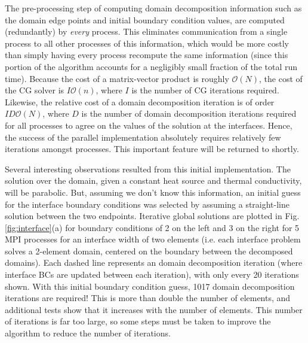 \documentclass[10pt]{article}
\begin{document}
The pre-processing step of computing domain decomposition information such as the domain edge points and initial boundary condition values, are computed (redundantly) by {\it every} process. This eliminates communication from a single process to all other processes of this information, which would be more costly than simply having every process recompute the same information (since this portion of the algorithm accounts for a negligibly small fraction of the total run time). Because the cost of a matrix-vector product is roughly \(\mathscr{O}(N)\), the cost of the CG solver is \(I\mathscr{O}(n)\), where \(I\) is the number of CG iterations required. Likewise, the relative cost of a domain decomposition iteration is of order \(ID\mathscr{O}(N)\), where \(D\) is the number of domain decomposition iterations required for all processes to agree on the values of the solution at the interfaces. Hence, the success of the parallel implementation absolutely requires relatively few iterations amongst processes. This important feature will be returned to shortly.

Several interesting observations resulted from this initial implementation. The solution over the domain, given a constant heat source and thermal conductivity, will be parabolic. But, assuming we don't know this information, an initial guess for the interface boundary conditions was selected by assuming a straight-line solution between the two endpoints. Iterative global solutions are plotted in Fig. \ref{fig:interface}(a) for boundary conditions of 2 on the left and 3 on the right for 5 MPI processes for an interface width of two elements (i.e. each interface problem solves a 2-element domain, centered on the boundary between the decomposed domains). Each dashed line represents an domain decomposition iteration (where interface BCs are updated between each iteration), with only every 20 iterations shown. With this initial boundary condition guess, 1017 domain decomposition iterations are required! This is more than double the number of elements, and additional tests show that it increases with the number of elements. This number of iterations is far too large, so some steps must be taken to improve the algorithm to reduce the number of iterations.
\end{document}
